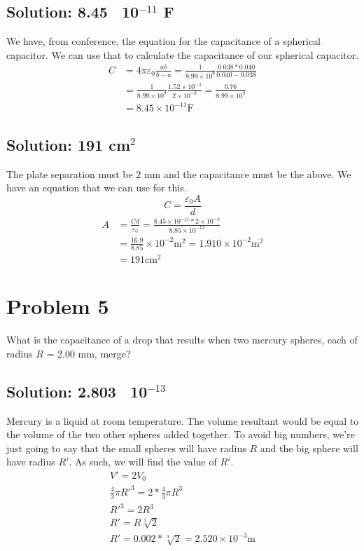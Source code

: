 \documentclass[12pt]{article}
\begin{document}
\subsection{Solution: 8.45 \texttimes\ 10$^{-11}$ F}
We have, from conference, the equation for the capacitance of a spherical capacitor.
We can use that to calculate the capacitance of our spherical capacitor.
\begin{align*}
    C   &=  4\pi\varepsilon_0 \frac{ab}{b - a}
        =   \frac{1}{8.99 \times 10^9} \frac{0.038 * 0.040}{0.040 - 0.038}\\
        &=  \frac{1}{8.99 \times 10^9} \frac{1.52 \times 10^{-3}}{2 \times 10^{-3}}
        =   \frac{0.76}{8.99 \times 10^9}\\
        &=  \boxed{8.45 \times 10^{-11} \unit{\farad}}
\end{align*}

\subsection{Solution: 191 cm$^2$}
The plate separation must be 2 \unit{\milli\meter} and the capacitance must be the above.
We have an equation that we can use for this.
\[
    C   =   \frac{\varepsilon_0 A}{d}
\]
\begin{align*}
    A   &=  \frac{Cd}{\varepsilon_0}
        =   \frac{8.45 \times 10^{-11} * 2 \times 10^{-3}}{8.85 \times 10^{-12}}\\
        &=  \frac{16.9}{8.85} \times 10^{-2} \unit{\meter^2}
        =   1.910 \times 10^{-2} \unit{\meter^2}\\
        &=  \boxed{191 \unit{\centi\meter^2}}
\end{align*}

\pagebreak
\section{Problem 5}
What is the capacitance of a drop that results when two mercury spheres, each of radius $R$ = 2.00 mm, merge?

\subsection*{Solution: 2.803 \texttimes\ 10$^{-13}$}
Mercury is a liquid at room temperature. 
The volume resultant would be equal to the volume of the two other spheres added together.
To avoid big numbers, we're just going to say that the small spheres will have radius $R$ and the big sphere will have radius $R'$. 
As such, we will find the value of $R'$.
\begin{gather*}
    V'  =   2V_0\\
    \frac{4}{3}\pi R'^3 =   2*\frac{4}{3}\pi R^3\\
    R'^3    =   2R^3\\
    R'      =   R\sqrt[3]{2}\\
    R'      =   0.002 * \sqrt[3]{2}
            =   2.520 \times 10^{-3} \unit{\meter}
\end{gather*}
\end{document}
